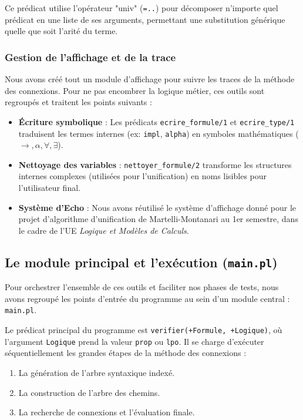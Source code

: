 \documentclass[12pt, a4paper]{article}
\begin{document}
Ce prédicat utilise l'opérateur "univ" (\texttt{=..}) pour décomposer n'importe quel prédicat en une liste de ses arguments, permettant une substitution générique quelle que soit l'arité du terme.

\subsubsection{Gestion de l'affichage et de la trace}

Nous avons créé tout un module d'affichage pour suivre les traces de la méthode des connexions. Pour ne pas encombrer la logique métier, ces outils sont regroupés et traitent les points suivants :

\begin{itemize}
    \item \textbf{Écriture symbolique} : Les prédicats \texttt{ecrire\_formule/1} et \texttt{ecrire\_type/1} traduisent les termes internes (ex: \texttt{impl}, \texttt{alpha}) en symboles mathématiques ($\rightarrow, \alpha, \forall, \exists$).
    \item \textbf{Nettoyage des variables} : \texttt{nettoyer\_formule/2} transforme les structures internes complexes (utilisées pour l'unification) en noms lisibles pour l'utilisateur final.
    \item \textbf{Système d'Echo} : Nous avons réutilisé le système d'affichage donné pour le projet d'algorithme d'unification de Martelli-Montanari au 1er semestre, dans le cadre de l'UE \textit{Logique et Modèles de Calculs}.
\end{itemize}

\subsection{Le module principal et l'exécution (\texttt{main.pl})}

Pour orchestrer l'ensemble de ces outils et faciliter nos phases de tests, nous avons regroupé les points d'entrée du programme au sein d'un module central : \texttt{main.pl}.

Le prédicat principal du programme est \texttt{verifier(+Formule, +Logique)}, où l'argument \texttt{Logique} prend la valeur \texttt{prop} ou \texttt{lpo}. Il se charge d'exécuter séquentiellement les grandes étapes de la méthode des connexions :
\begin{enumerate}
    \item La génération de l'arbre syntaxique indexé.
    \item La construction de l'arbre des chemins.
    \item La recherche de connexions et l'évaluation finale.
\end{enumerate}
\end{document}
